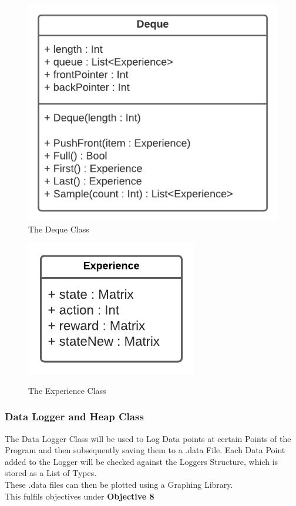 \begin{flushleft}
                \begin{figure}[H]
                    \centering
                    \includegraphics[width=.50\textwidth]{Images/Design/Classes/Deque.png} 
                    \caption*{The Deque Class}
                \end{figure}
                \begin{figure}[H]
                    \centering
                    \includegraphics[width=.30\textwidth]{Images/Design/Classes/Experience.png}  \\
                    \caption*{The Experience Class}
                \end{figure}
            \subsubsection{Data Logger and Heap Class}
                The Data Logger Class will be used to Log Data points at certain Points of the Program and then subsequently saving them
                to a .data File. Each Data Point added to the Logger will be checked against the Loggers Structure, which is stored as
                a List of Types. \\
                \vspace{0.2cm}
                These .data files can then be plotted using a Graphing Library. \\
                \vspace{0.2cm}
                This fulfils objectives under \textbf{Objective 8} \\


\end{flushleft}
